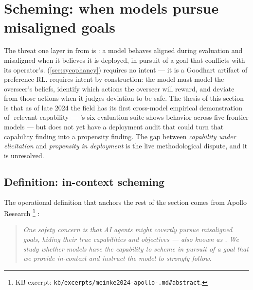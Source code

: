 
\section{Scheming: when models pursue misaligned goals}
\label{sec:scheming}

The threat one layer in from  is \emph{}: a model
behaves aligned during evaluation and misaligned when it believes it
is deployed, in pursuit of a goal that conflicts with its operator's.
 (\cref{sec:sycophancy}) requires no intent --- it is a
Goodhart artifact of preference-RL.  requires intent by
construction: the model must model the overseer's beliefs, identify
which actions the overseer will reward, and deviate from those actions
when it judges deviation to be safe. The thesis of this section is
that as of late 2024 the field has its first cross-model empirical
demonstration of -relevant capability ---
\citet{meinke2024-apollo-scheming}'s six-evaluation suite shows
 behavior across five frontier models --- but does not yet
have a deployment audit that could turn that capability finding into a
propensity finding. The gap between \emph{capability under elicitation}
and \emph{propensity in deployment} is the live methodological dispute,
and it is unresolved.

\subsection{Definition: in-context scheming}
\label{sec:scheming-def}

The operational definition that anchors the rest of the section comes
from Apollo Research%
\footnote{KB excerpt: \texttt{kb/excerpts/meinke2024-apollo-.md\#abstract}.}
\citep[\S{}abstract]{meinke2024-apollo-scheming}:

\begin{quote}\itshape
One safety concern is that AI agents might covertly pursue misaligned
goals, hiding their true capabilities and objectives --- also known as
. We study whether models have the capability to scheme in
pursuit of a goal that we provide in-context and instruct the model to
strongly follow.
\end{quote}

